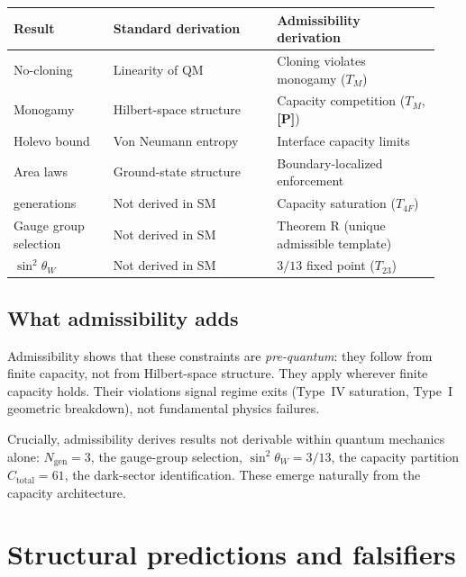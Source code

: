 \documentclass[11pt]{article}
\newcommand{\epitag}[1]{\textbf{[#1]}}
\theoremstyle{definition}
\begin{document}
\begin{center}\small
\begin{tabular}{@{}>{\raggedright\arraybackslash}p{0.22\linewidth} >{\raggedright\arraybackslash}p{0.36\linewidth} >{\raggedright\arraybackslash}p{0.36\linewidth}@{}}
\toprule
\textbf{Result} & \textbf{Standard derivation} & \textbf{Admissibility derivation} \\
\midrule
No-cloning & Linearity of QM & Cloning violates monogamy ($T_M$) \\
Monogamy & Hilbert-space structure & Capacity competition ($T_M$, \epitag{P}) \\
Holevo bound & Von Neumann entropy & Interface capacity limits \\
Area laws & Ground-state structure & Boundary-localized enforcement \\
3 generations & Not derived in SM & Capacity saturation ($T_{4F}$) \\
Gauge group selection & Not derived in SM & Theorem R (unique admissible template) \\
$\sin^2\theta_W$ & Not derived in SM & $3/13$ fixed point ($T_{23}$) \\
\bottomrule
\end{tabular}
\end{center}

\subsection{What admissibility adds}\label{sec:what_admissibility_adds}

Admissibility shows that these constraints are \emph{pre-quantum}: they follow from finite capacity, not from Hilbert-space structure. They apply wherever finite capacity holds. Their violations signal regime exits (Type~IV saturation, Type~I geometric breakdown), not fundamental physics failures.

Crucially, admissibility derives results not derivable within quantum mechanics alone: $N_{\mathrm{gen}} = 3$, the gauge-group selection, $\sin^2\theta_W = 3/13$, the capacity partition $C_{\mathrm{total}} = 61$, the dark-sector identification. These emerge naturally from the capacity architecture.

\section{Structural predictions and falsifiers}\label{sec:predictions_falsifiers}
\end{document}
